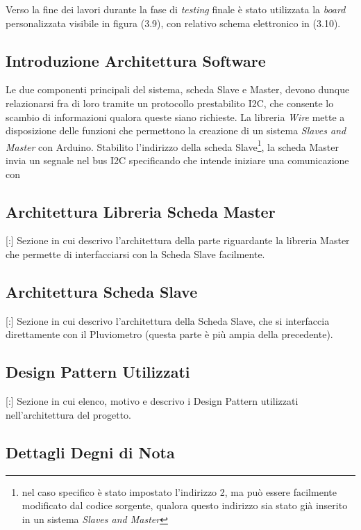 Verso la fine dei lavori durante la fase di \textit{testing} finale è stato utilizzata la \textit{board} personalizzata visibile in figura (3.9), con relativo schema elettronico in (3.10).
\subsection{Introduzione Architettura Software}

Le due componenti principali del sistema, scheda Slave e Master, devono dunque relazionarsi fra di loro tramite un protocollo prestabilito I2C, che consente lo scambio di informazioni qualora queste siano richieste. La libreria \textit{Wire} mette a disposizione delle funzioni che permettono la creazione di un sistema \textit{Slaves and Master} con Arduino. Stabilito l'indirizzo della scheda Slave\footnote{nel caso specifico è stato impostato l'indirizzo 2, ma può essere facilmente modificato dal codice sorgente, qualora questo indirizzo sia stato già inserito in un sistema \textit{Slaves and Master}}, la scheda Master invia un segnale nel bus I2C specificando che intende iniziare una comunicazione con 

\subsection{Architettura Libreria Scheda Master}

[:] Sezione in cui descrivo l'architettura della parte riguardante la libreria Master che permette di interfacciarsi con la Scheda Slave facilmente. 


\subsection{Architettura Scheda Slave}

[:] Sezione in cui descrivo l'architettura della Scheda Slave, che si interfaccia direttamente con il Pluviometro (questa parte è più ampia della precedente).

\subsection{Design Pattern Utilizzati}

[:] Sezione in cui elenco, motivo e descrivo i Design Pattern utilizzati nell'architettura del progetto.

\subsection{Dettagli Degni di Nota}

